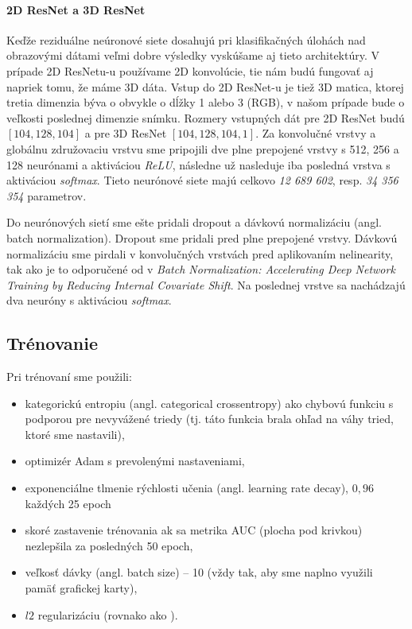 \paragraph{2D ResNet a 3D ResNet} Keďže reziduálne neúronové siete dosahujú pri klasifikačných úlohách nad obrazovými dátami veľmi dobre výsledky vyskúšame aj tieto architektúry. V prípade 2D ResNetu-u používame 2D konvolúcie, tie nám budú fungovať aj napriek tomu, že máme 3D dáta. Vstup do 2D ResNet-u je tiež 3D matica, ktorej tretia dimenzia býva o obvykle o dĺžky 1 alebo 3 (RGB), v našom prípade bude o veľkosti poslednej dimenzie snímku. Rozmery vstupných dát pre 2D ResNet budú $[104, 128, 104]$ a pre 3D ResNet $[104, 128, 104, 1]$. Za konvolučné vrstvy a globálnu združovaciu vrstvu sme pripojili dve plne prepojené vrstvy s 512, 256 a 128 neurónami a aktiváciou \textit{ReLU}, následne už nasleduje iba posledná vrstva s aktiváciou \textit{softmax}. Tieto neurónové siete majú celkovo \textit{12 689 602}, resp. \textit{34 356 354} parametrov.

Do neurónových sietí sme ešte pridali dropout a dávkovú normalizáciu (angl. batch normalization). Dropout sme pridali pred plne prepojené vrstvy. Dávkovú normalizáciu sme pirdali v konvolučných vrstvách pred aplikovaním nelinearity, tak ako je to odporučené od \citeauthor*{ioffe2015batch} v \textit{Batch Normalization: Accelerating Deep Network Training by Reducing Internal Covariate Shift}. Na poslednej vrstve sa nachádzajú dva neuróny s aktiváciou \textit{softmax}.

\subsection{Trénovanie}

Pri trénovaní sme použili:

\begin{itemize}
    \item kategorickú entropiu (angl. categorical crossentropy) ako chybovú funkciu s podporou pre nevyvážené triedy (tj. táto funkcia brala ohľad na váhy tried, ktoré sme nastavili),
    \item optimizér Adam s prevolenými nastaveniami,
    \item exponenciálne tlmenie rýchlosti učenia (angl. learning rate decay), $0,96$ každých 25 epoch
    \item skoré zastavenie trénovania ak sa metrika AUC (plocha pod krivkou) nezlepšila za posledných 50 epoch,
    \item veľkosť dávky (angl. batch size) -- 10 (vždy tak, aby sme naplno využili pamäť grafickej karty),
    \item $l2$ regularizáciu (rovnako ako \citeauthor*{esmaeilzadeh2018end}).
\end{itemize}

